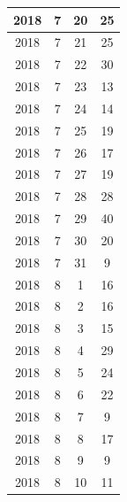 \begin{longtable} {|c|c|c|c|}
\hline
2018         & 7            & 20           & 25                        \\ 
\hline
2018         & 7            & 21           & 25                        \\ 
\hline
2018         & 7            & 22           & 30                        \\ 
\hline
2018         & 7            & 23           & 13                        \\ 
\hline
2018         & 7            & 24           & 14                        \\ 
\hline
2018         & 7            & 25           & 19                        \\ 
\hline
2018         & 7            & 26           & 17                        \\ 
\hline
2018         & 7            & 27           & 19                        \\ 
\hline
2018         & 7            & 28           & 28                        \\ 
\hline
2018         & 7            & 29           & 40                        \\ 
\hline
2018         & 7            & 30           & 20                        \\ 
\hline
2018         & 7            & 31           & 9                         \\ 
\hline
2018         & 8            & 1            & 16                        \\ 
\hline
2018         & 8            & 2            & 16                        \\ 
\hline
2018         & 8            & 3            & 15                        \\ 
\hline
2018         & 8            & 4            & 29                        \\ 
\hline
2018         & 8            & 5            & 24                        \\ 
\hline
2018         & 8            & 6            & 22                        \\ 
\hline
2018         & 8            & 7            & 9                         \\ 
\hline
2018         & 8            & 8            & 17                        \\ 
\hline
2018         & 8            & 9            & 9                         \\ 
\hline
2018         & 8            & 10           & 11                        \\ 

\end{longtable}
